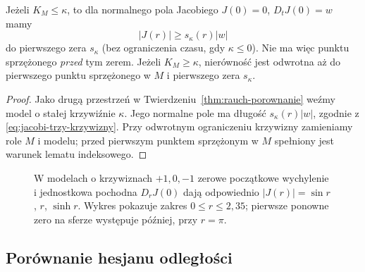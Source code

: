 \begin{wniosek}
\label{cor:rauch-model}
Jeżeli $K_M\leq\kappa$, to dla normalnego
pola Jacobiego $J(0)=0$, $D_tJ(0)=w$ mamy
\begin{equation}\label{eq:jacobi-gorne-K}
 |J(r)|\geq s_\kappa(r)|w|
\end{equation}
do pierwszego zera $s_\kappa$ (bez ograniczenia
czasu, gdy $\kappa\leq0$). Nie ma więc
punktu sprzężonego \emph{przed} tym zerem.
Jeżeli $K_M\geq\kappa$, nierówność jest
odwrotna aż do pierwszego punktu sprzężonego
w $M$ i pierwszego zera $s_\kappa$.
\end{wniosek}
\begin{proof}
Jako drugą przestrzeń w
Twierdzeniu~\ref{thm:rauch-porownanie}
weźmy model o stałej krzywiźnie $\kappa$.
Jego normalne pole ma długość
$s_\kappa(r)|w|$, zgodnie z
\eqref{eq:jacobi-trzy-krzywizny}.
Przy odwrotnym ograniczeniu krzywizny
zamieniamy role $M$ i modelu; przed
pierwszym punktem sprzężonym w $M$ spełniony
jest warunek lematu indeksowego.
\end{proof}

\begin{figure}[htbp]
\centering
{}
\caption{W modelach o krzywiznach $+1,0,-1$ zerowe początkowe wychylenie i jednostkowa pochodna $D_rJ(0)$ dają odpowiednio $|J(r)|=\sin r$, $r$, $\sinh r$. Wykres pokazuje zakres $0\leq r\leq2{,}35$; pierwsze ponowne zero na sferze występuje później, przy $r=\pi$.}
\label{fig:rauch-porownanie-jacobiego}
\end{figure}

\subsection*{Porównanie hesjanu odległości}

